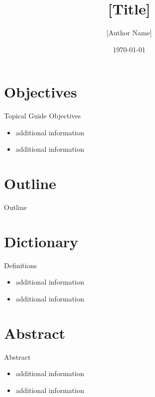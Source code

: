 \documentclass{beamer}
\title{[Title] \linebreak [Subtitle]}
\author{[Author Name]}
\date{\today}
\begin{document}
\frame{\titlepage}


\section{Objectives}
\begin{frame}{Topical Guide Objectives}
  \begin{itemize}
    \item<1-> additional information
    \item<2-> additional information
  \end{itemize}
\end{frame}


\section{Outline}
\begin{frame}{Outline}
  \tableofcontents
\end{frame}


\section{Dictionary}
\begin{frame}{Definitions}
  \begin{itemize}
    \item<1-> additional information
    \item<2-> additional information
  \end{itemize}
\end{frame}


\section{Abstract}
\begin{frame}{Abstract}
  \begin{itemize}
    \item<1-> additional information
    \item<2-> additional information
  \end{itemize}
\end{frame}
\end{document}
